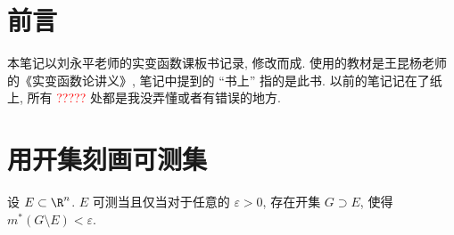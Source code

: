\documentclass[UTF8, a4paper, 12pt, twoside, onecolumn]{book}
\newcommand{\watermark}[3]{\AddToShipoutPictureBG{
\parbox[b][\paperheight]{\paperwidth}{
\vfill%
\centering%
\tikz[remember picture, overlay]%
  \node [rotate = #1, scale = #2] at (current page.center)%
    {\textcolor{gray!80!cyan!30}{#3}};
\vfill}}}
\begin{document}

\thispagestyle{plain}

\renewcommand{\thepage}{C\arabic{page}}

\maketitle

\frontmatter	%
\chapter*{前言}

本笔记以刘永平老师的实变函数课板书记录, 修改而成. 使用的教材是王昆杨老师的《实变函数论讲义》, 笔记中提到的 “书上” 指的是此书. 以前的笔记记在了纸上, 所有 \textcolor{red}{?????} 处都是我没弄懂或者有错误的地方.

\tableofcontents

\mainmatter	%

\chapter{用开集刻画可测集}	%

\begin{Theorem}\label{thm:OpenMeas}
	设 $E \subset \R^n$. $E$ 可测当且仅当对于任意的 $\varepsilon > 0$, 存在开集 $G \supset E$, 使得 $m^*(G \setminus E) < \varepsilon$.
\end{Theorem}
\end{document}
